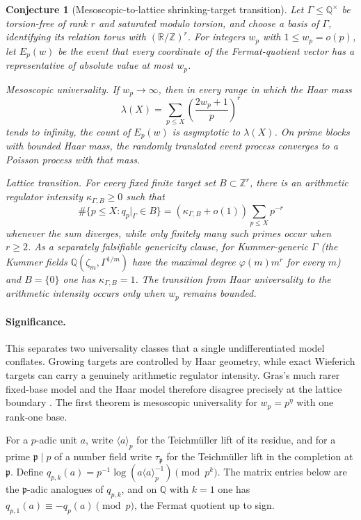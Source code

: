 \documentclass[11pt]{article}
\newtheorem{conjecture}{Conjecture}
\theoremstyle{definition}
\newcommand{\Z}{\mathbb Z}
\newcommand{\Q}{\mathbb Q}
\newcommand{\R}{\mathbb R}
\providecommand{\Z}{\mathbb Z}
\providecommand{\Q}{\mathbb Q}
\providecommand{\R}{\mathbb R}
\begin{document}
\begin{conjecture}[Mesoscopic-to-lattice shrinking-target transition]\label{s13}
Let $\Gamma\le\Q^\times$ be torsion-free of rank $r$ and saturated modulo torsion, and choose a
basis of $\Gamma$, identifying its relation torus with $(\R/\Z)^r$.  For integers $w_p$ with $1\le w_p=o(p)$, let $E_p(w)$ be the event
that every coordinate of the Fermat-quotient vector has a representative of absolute
value at most $w_p$.

\emph{Mesoscopic universality.}  If $w_p\to\infty$, then in every range in which the
Haar mass
\[
 \lambda(X)=\sum_{p\le X}\left(\frac{2w_p+1}{p}\right)^r
\]
tends to infinity, the count of $E_p(w)$ is asymptotic to $\lambda(X)$.  On prime
blocks with bounded Haar mass, the randomly translated event process converges to
a Poisson process with that mass.

\emph{Lattice transition.}  For every fixed finite target set
$B\subset\Z^r$, there is an arithmetic regulator intensity
$\kappa_{\Gamma,B}\ge0$ such that
\[
 \#\{p\le X:q_p|_\Gamma\in B\}
 =(\kappa_{\Gamma,B}+o(1))\sum_{p\le X}p^{-r}
\]
whenever the sum diverges, while only finitely many such primes occur when $r\ge2$.
As a separately falsifiable genericity clause, for Kummer-generic $\Gamma$ (the Kummer fields $\Q(\zeta_m,\Gamma^{1/m})$ have the maximal degree $\varphi(m)m^{r}$ for every $m$) and $B=\{0\}$ one has $\kappa_{\Gamma,B}=1$.  The transition from
Haar universality to the arithmetic intensity occurs only when $w_p$ remains bounded.
\end{conjecture}

\paragraph{Significance.}
This separates two universality classes that a single undifferentiated model
conflates.  Growing targets
are controlled by Haar geometry, while exact Wieferich targets can carry a genuinely
arithmetic regulator intensity.  Gras's much rarer fixed-base model and the Haar model
therefore disagree precisely at the lattice boundary \cite{Gras,BGKK}.  The first
theorem is mesoscopic universality for $w_p=p^\eta$ with one rank-one base.

For a $p$-adic unit $a$, write $\langle a\rangle_p$ for the Teichm\"uller lift of
its residue, and for a prime $\mathfrak p\mid p$ of a number field write
$\tau_{\mathfrak p}$ for the Teichm\"uller lift in the completion at
$\mathfrak p$.  Define
$ q_{p,k}(a)=p^{-1}\log(a\langle a\rangle_p^{-1})\pmod{p^k}$.  The matrix entries below are the $\mathfrak p$-adic analogues of $q_{p,k}$, and on $\Q$ with $k=1$ one has $q_{p,1}(a)\equiv-q_p(a)\pmod p$, the Fermat quotient up to sign.
\end{document}
